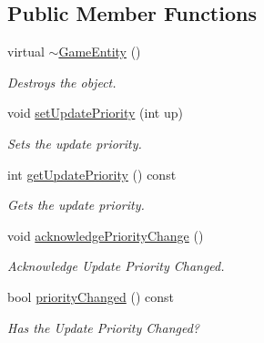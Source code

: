 \subsection*{Public Member Functions}
\begin{DoxyCompactItemize}
\item 
\mbox{\label{class_game_entity_a65c3157821d08e33a2377adce8e6ca8c}} 
virtual \mbox{\hyperlink{class_game_entity_a65c3157821d08e33a2377adce8e6ca8c}{$\sim$\+Game\+Entity}} ()
\begin{DoxyCompactList}\small\item\em Destroys the object. \end{DoxyCompactList}\item 
\mbox{\label{class_game_entity_a98197ff598b1192970d8668b9df32514}} 
void \mbox{\hyperlink{class_game_entity_a98197ff598b1192970d8668b9df32514}{set\+Update\+Priority}} (int up)
\begin{DoxyCompactList}\small\item\em Sets the update priority. \end{DoxyCompactList}\item 
\mbox{\label{class_game_entity_ab4311e50a4e200a01a6548a1729ba395}} 
int \mbox{\hyperlink{class_game_entity_ab4311e50a4e200a01a6548a1729ba395}{get\+Update\+Priority}} () const
\begin{DoxyCompactList}\small\item\em Gets the update priority. \end{DoxyCompactList}\item 
void \mbox{\hyperlink{class_game_entity_a944913c4ecb2e4279831f2b4883b61d1}{acknowledge\+Priority\+Change}} ()
\begin{DoxyCompactList}\small\item\em Acknowledge Update Priority Changed. \end{DoxyCompactList}\item 
\mbox{\label{class_game_entity_a55352bcd3bdff64a046d10324c8ddb24}} 
bool \mbox{\hyperlink{class_game_entity_a55352bcd3bdff64a046d10324c8ddb24}{priority\+Changed}} () const
\begin{DoxyCompactList}\small\item\em Has the Update Priority Changed? \end{DoxyCompactList}\item 

\end{DoxyCompactItemize}
